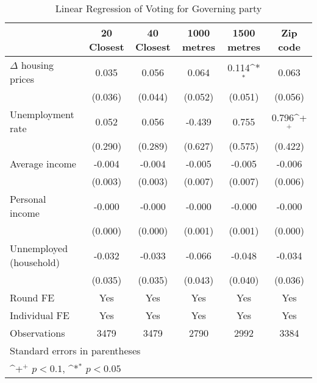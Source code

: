 \begin{table}[htbp]\centering
\def\sym#1{\ifmmode^{#1}\else\(^{#1}\)\fi}
\caption{Linear Regression of Voting for Governing party } \label{inddv}
\begin{tabular}{l*{5}{c}}
\hline\hline
                    &\multicolumn{1}{c}{20 Closest}&\multicolumn{1}{c}{40 Closest}&\multicolumn{1}{c}{1000 metres}&\multicolumn{1}{c}{1500 metres}&\multicolumn{1}{c}{Zip code}\\
\hline
$\Delta$ housing prices&       0.035       &       0.056       &       0.064       &       0.114\sym{*}&       0.063       \\
                    &     (0.036)       &     (0.044)       &     (0.052)       &     (0.051)       &     (0.056)       \\
[1em]
Unemployment rate   &       0.052       &       0.056       &      -0.439       &       0.755       &       0.796\sym{+}\\
                    &     (0.290)       &     (0.289)       &     (0.627)       &     (0.575)       &     (0.422)       \\
[1em]
Average income      &      -0.004       &      -0.004       &      -0.005       &      -0.005       &      -0.006       \\
                    &     (0.003)       &     (0.003)       &     (0.007)       &     (0.007)       &     (0.006)       \\
[1em]
Personal income     &      -0.000       &      -0.000       &      -0.000       &      -0.000       &      -0.000       \\
                    &     (0.000)       &     (0.000)       &     (0.001)       &     (0.001)       &     (0.000)       \\
[1em]
Unnemployed (household)&      -0.032       &      -0.033       &      -0.066       &      -0.048       &      -0.034       \\
                    &     (0.035)       &     (0.035)       &     (0.043)       &     (0.040)       &     (0.036)       \\
[1em]
\hline  Round FE    &         Yes       &         Yes       &         Yes       &         Yes       &         Yes       \\
[1em]
Individual FE            &         Yes       &         Yes       &         Yes       &         Yes       &         Yes       \\
\hline
Observations        &        3479       &        3479       &        2790       &        2992       &        3384       \\
\hline\hline
\multicolumn{6}{l}{\footnotesize Standard errors in parentheses}\\
\multicolumn{6}{l}{\footnotesize \sym{+} \(p<0.1\), \sym{*} \(p<0.05\)}\\
\end{tabular}
\end{table}
